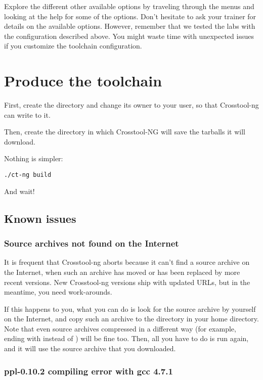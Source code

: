Explore the different other available options by traveling through the
menus and looking at the help for some of the options. Don't hesitate
to ask your trainer for details on the available options. However,
remember that we tested the labs with the configuration described
above. You might waste time with unexpected issues if you customize the
toolchain configuration.

\section{Produce the toolchain}

First, create the directory  and change its
owner to your user, so that Crosstool-ng can write to it.

Then, create the directory  in which Crosstool-NG
will save the tarballs it will download.

Nothing is simpler:

\begin{verbatim}
./ct-ng build
\end{verbatim}

And wait!

\subsection{Known issues}

\subsubsection{Source archives not found on the Internet}

It is frequent that Crosstool-ng aborts because it can't find a
source archive on the Internet, when such an archive has moved or has
been replaced by more recent versions. New Crosstool-ng versions ship
with updated URLs, but in the meantime, you need work-arounds.

If this happens to you, what you can do is look for the source archive by
yourself on the Internet, and copy such an archive to the 
directory in your home directory. Note that even source archives
compressed in a different way (for example, ending with 
instead of ) will be fine too. Then, all you have to do is run
 again, and it will use the source archive that you
downloaded.

\subsubsection{ppl-0.10.2 compiling error with gcc 4.7.1}

